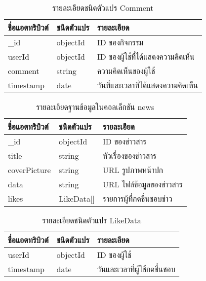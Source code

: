 \begin{table}
    \caption{รายละเอียดชนิดตัวแปร Comment}
    \begin{tabularx}{\textwidth}{ | l | l | X | }
        \hline
        \bf ชื่อแอตทริบิวต์ & \bf ชนิดตัวแปร & \bf รายละเอียด \\\hline
        \_id & objectId & ID ของกิจกรรม\\\hline
        userId & objectId & ID ของผู้ใช้ที่ได้แสดงความคิดเห็น\\\hline
        comment & string & ความคิดเห็นของผู้ใช้\\\hline
        timestamp & date & วันที่และเวลาที่ได้แสดงความคิดเห็น\\\hline
    \end{tabularx}
\end{table}

\begin{table}
    \caption{รายละเอียดฐานข้อมูลในคอลเล็กชัน news}
    \begin{tabularx}{\textwidth}{ | l | l | X | }
        \hline
        \bf ชื่อแอตทริบิวต์ & \bf ชนิดตัวแปร & \bf รายละเอียด \\\hline
        \_id & objectId & ID ของข่าวสาร\\\hline
        title & string & หัวเรื่องของข่าวสาร\\\hline
        coverPicture & string & URL รูปภาพหน้าปก\\\hline
        data & string & URL ไฟล์ข้อมูลของข่าวสาร\\\hline
        likes & LikeData[] & รายการผู้ที่กดชื่นชอบข่าว\\\hline
    \end{tabularx}
\end{table}

\begin{table}
    \caption{รายละเอียดชนิดตัวแปร LikeData}
    \begin{tabularx}{\textwidth}{ | l | l | X | }
        \hline
        \bf ชื่อแอตทริบิวต์ & \bf ชนิดตัวแปร & \bf รายละเอียด \\\hline
        userId & objectId & ID ของผู้ใช้\\\hline
        timestamp & date & วันและเวลาที่ผู้ใช้กดชื่นชอบ\\\hline
    \end{tabularx}
\end{table}

